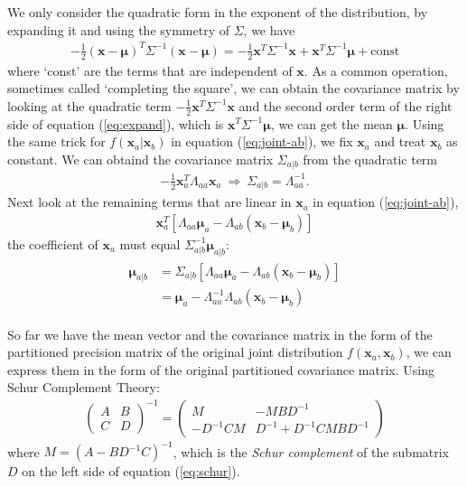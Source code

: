 {We only consider the quadratic form in the exponent of the distribution, by expanding it and using the symmetry of $\Sigma$, we have
\begin{align}
-\frac{1}{2}(\mathbf{x}-\mathbf{\mu})^T\Sigma^{-1}(\mathbf{x}-\mathbf{\mu})=-\frac{1}{2}\mathbf{x}^T\Sigma^{-1}\mathbf{x}+\mathbf{x}^T\Sigma^{-1}\mathbf{\mu}+\text{const}
\label{eq:expand}
\end{align}
where `const' are the terms that are independent of $\mathbf{x}$. As a common operation, sometimes called `completing the square', we can obtain the covariance matrix by looking at the quadratic term $-\frac{1}{2}\mathbf{x}^T\Sigma^{-1}\mathbf{x}$ and the second order term of the right side of equation (\ref{eq:expand}), which is $\mathbf{x}^T\Sigma^{-1}\mathbf{\mu}$, we can get the mean $\mathbf{\mu}$. 
Using the same trick for $f(\mathbf{x}_a|\mathbf{x}_b)$ in equation (\ref{eq:joint-ab}), we fix $\mathbf{x}_a$ and treat $\mathbf{x}_b$ as constant. We can obtaind the covariance matrix $\Sigma_{a|b}$ from the quadratic term  
\begin{align}
-\frac{1}{2}\mathbf{x}_a^{T}\Lambda_{aa}\mathbf{x}_a\:\Rightarrow\:\Sigma_{a|b}=\Lambda_{aa}^{-1}.
\label{eq:cov}
\end{align}
Next look at the remaining terms that are linear in $\mathbf{x}_a$ in equation (\ref{eq:joint-ab}), 
\begin{align}
\mathbf{x}_a^{T}[\Lambda_{aa}\mathbf{\mu}_a-\Lambda_{ab}(\mathbf{x}_b-\mathbf{\mu}_b)]
\end{align}
the coefficient of $\mathbf{x}_a$ must equal $\Sigma_{a|b}^{-1}\mathbf{\mu}_{a|b}$:
\begin{align}
\begin{split}
\mathbf{\mu}_{a|b} & =\Sigma_{a|b}[\Lambda_{aa}\mathbf{\mu}_a-\Lambda_{ab}(\mathbf{x}_b-\mathbf{\mu}_b)] \\
& =\mathbf{\mu}_a-\Lambda_{aa}^{-1}\Lambda_{ab}(\mathbf{x}_b-\mathbf{\mu}_b)
\end{split}
\label{eq:mean}
\end{align}

So far we have the mean vector and the covariance matrix in the form of the partitioned precision matrix of the original joint distribution $f(\mathbf{x}_a, \mathbf{x}_b)$, we can express them in the form of the original partitioned covariance matrix.
Using Schur Complement Theory:
\begin{align}
\begin{pmatrix} 
A & B \\
C & D 
\end{pmatrix}^{-1}
=\begin{pmatrix} 
M & -MBD^{-1} \\
-D^{-1}CM & D^{-1}+D^{-1}CMBD^{-1} 
\end{pmatrix}
\label{eq:schur}
\end{align}
where $M = (A-BD^{-1}C)^{-1}$, which is the \emph{Schur complement} of the submatrix $D$ on the left side of equation (\ref{eq:schur}).

}

